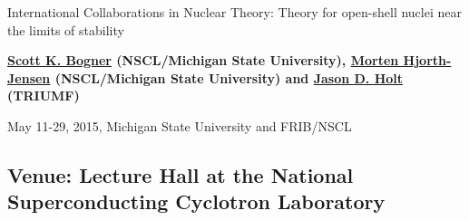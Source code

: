 \documentclass[%
twoside,                 %
final,                   %
10pt]{article}
\begin{document}






\thispagestyle{empty}

\begin{center}
{\LARGE\bf
\begin{spacing}{1.25}
International Collaborations in Nuclear Theory: Theory for open-shell nuclei near the limits of stability
\end{spacing}
}
\end{center}


\begin{center}
{\bf \href{{http://nscl.msu.edu/directory/bogner.html}}{Scott K. Bogner} (NSCL/Michigan State University), \href{{https://www.pa.msu.edu/profile/hjensen}}{Morten Hjorth-Jensen} (NSCL/Michigan State University) and \href{{http://www.triumf.ca/jason-d-holt}}{Jason D. Holt} (TRIUMF)${}^{}$} \\ [0mm]
\end{center}

    \begin{center}
\end{center}
    


\begin{center} %
May 11-29, 2015, Michigan State University and FRIB/NSCL
\end{center}

\vspace{1cm}


\subsection{Venue: Lecture Hall at the National Superconducting Cyclotron Laboratory}

\end{document}
